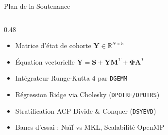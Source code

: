 \documentclass[aspectratio=169, 10pt, french]{beamer}
\begin{document}
\begin{frame}{Plan de la Soutenance}
\begin{columns}[t]
        \begin{column}{0.48\textwidth}
            \begin{cadrehpc}
                \small
                \begin{itemize}
                    \item Matrice d'état de cohorte $\mathbf{Y} \in \mathbb{R}^{N \times 5}$
                    \item Équation vectorielle $\dot{\mathbf{Y}} = \mathbf{S} + \mathbf{Y}\mathbf{M}^T + \mathbf{\Phi}\mathbf{A}^T$
                    \item Intégrateur Runge-Kutta 4 par \texttt{DGEMM}
                \end{itemize}
            \end{cadrehpc}
            \vspace{0.15cm}
            \begin{cadrehpc}
                \small
                \begin{itemize}
                    \item Régression Ridge via Cholesky (\texttt{DPOTRF/DPOTRS})
                    \item Stratification ACP Divide \& Conquer (\texttt{DSYEVD})
                    \item Bancs d'essai : Naïf vs MKL, Scalabilité OpenMP
                \end{itemize}
            \end{cadrehpc}
        \end{column}
    \end{columns}
\end{frame}

\end{document}

